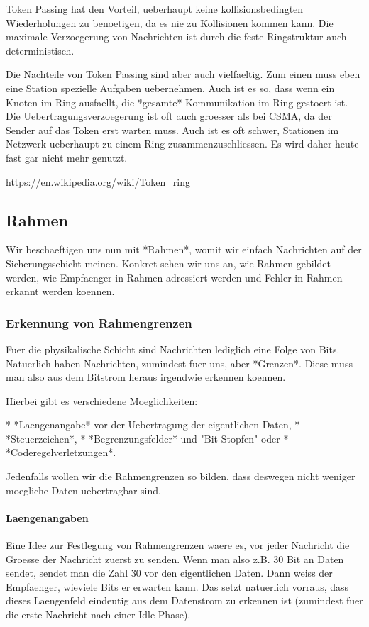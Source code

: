 Token Passing hat den Vorteil, ueberhaupt keine kollisionsbedingten
Wiederholungen zu benoetigen, da es nie zu Kollisionen kommen kann. Die
maximale Verzoegerung von Nachrichten ist durch die feste Ringstruktur auch
deterministisch.

Die Nachteile von Token Passing sind aber auch vielfaeltig. Zum einen muss eben
eine Station spezielle Aufgaben uebernehmen. Auch ist es so, dass wenn ein
Knoten im Ring ausfaellt, die *gesamte* Kommunikation im Ring gestoert ist. Die
Uebertragungsverzoegerung ist oft auch groesser als bei CSMA, da der Sender auf
das Token erst warten muss. Auch ist es oft schwer, Stationen im Netzwerk
ueberhaupt zu einem Ring zusammenzuschliessen. Es wird daher heute fast gar
nicht mehr genutzt.

https://en.wikipedia.org/wiki/Token\_ring

\subsection{Rahmen} 

Wir beschaeftigen uns nun mit *Rahmen*, womit wir einfach Nachrichten auf der
Sicherungsschicht meinen. Konkret sehen wir uns an, wie Rahmen gebildet werden,
wie Empfaenger in Rahmen adressiert werden und Fehler in Rahmen erkannt werden
koennen.

\subsubsection{Erkennung von Rahmengrenzen} 

Fuer die physikalische Schicht sind Nachrichten lediglich eine Folge von
Bits. Natuerlich haben Nachrichten, zumindest fuer uns, aber *Grenzen*. Diese
muss man also aus dem Bitstrom heraus irgendwie erkennen koennen.

Hierbei gibt es verschiedene Moeglichkeiten:

* *Laengenangabe* vor der Uebertragung der eigentlichen Daten,
* *Steuerzeichen*,
* *Begrenzungsfelder* und "Bit-Stopfen" oder
* *Coderegelverletzungen*.

Jedenfalls wollen wir die Rahmengrenzen so bilden, dass deswegen nicht weniger
moegliche Daten uebertragbar sind.

\paragraph{Laengenangaben} 

Eine Idee zur Festlegung von Rahmengrenzen waere es, vor jeder Nachricht die
Groesse der Nachricht zuerst zu senden. Wenn man also z.B. $30$ Bit an Daten
sendet, sendet man die Zahl $30$ vor den eigentlichen Daten. Dann weiss der
Empfaenger, wieviele Bits er erwarten kann. Das setzt natuerlich vorraus, dass
dieses Laengenfeld eindeutig aus dem Datenstrom zu erkennen ist (zumindest fuer
die erste Nachricht nach einer Idle-Phase).

